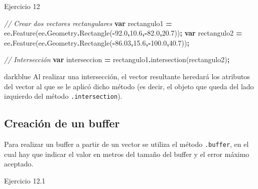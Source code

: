 \documentclass[
  12pt,
  letterpaper,
  twoside]{book}
\newenvironment{Shaded}{\begin{snugshade}}{\end{snugshade}}
\newcommand{\AttributeTok}[1]{\textcolor[rgb]{0.77,0.63,0.00}{#1}}
\newcommand{\CommentTok}[1]{\textcolor[rgb]{0.56,0.35,0.01}{\textit{#1}}}
\newcommand{\FloatTok}[1]{\textcolor[rgb]{0.00,0.00,0.81}{#1}}
\newcommand{\FunctionTok}[1]{\textcolor[rgb]{0.00,0.00,0.00}{#1}}
\newcommand{\KeywordTok}[1]{\textcolor[rgb]{0.13,0.29,0.53}{\textbf{#1}}}
\newcommand{\NormalTok}[1]{#1}
\newcommand{\OperatorTok}[1]{\textcolor[rgb]{0.81,0.36,0.00}{\textbf{#1}}}
\begin{document}
Ejercicio 12

\begin{Shaded}
\begin{Highlighting}[]
\CommentTok{// Crear dos vectores rectangulares}
\KeywordTok{var}\NormalTok{ rectangulo1 }\OperatorTok{=}\NormalTok{ ee}\OperatorTok{.}\FunctionTok{Feature}\NormalTok{(ee}\OperatorTok{.}\AttributeTok{Geometry}\OperatorTok{.}\FunctionTok{Rectangle}\NormalTok{(}\OperatorTok{{-}}\FloatTok{92.0}\OperatorTok{,}\FloatTok{10.6}\OperatorTok{,{-}}\FloatTok{82.0}\OperatorTok{,}\FloatTok{20.7}\NormalTok{))}\OperatorTok{;}
\KeywordTok{var}\NormalTok{ rectangulo2 }\OperatorTok{=}\NormalTok{ ee}\OperatorTok{.}\FunctionTok{Feature}\NormalTok{(ee}\OperatorTok{.}\AttributeTok{Geometry}\OperatorTok{.}\FunctionTok{Rectangle}\NormalTok{(}\OperatorTok{{-}}\FloatTok{86.03}\OperatorTok{,}\FloatTok{15.6}\OperatorTok{,{-}}\FloatTok{100.0}\OperatorTok{,}\FloatTok{40.7}\NormalTok{))}\OperatorTok{;}

\CommentTok{// Intersección}
\KeywordTok{var}\NormalTok{ interseccion }\OperatorTok{=}\NormalTok{ rectangulo1}\OperatorTok{.}\FunctionTok{intersection}\NormalTok{(rectangulo2)}\OperatorTok{;}
\end{Highlighting}
\end{Shaded}

\begin{bluebox2}

\begin{awesomeblock}{5pt}{\faLightbulb}{darkblue}
Al realizar una intersección, el vector resultante heredará los atributos del vector al que se le aplicó dicho método (es decir, el objeto que queda del lado izquierdo del método \texttt{.intersection}).

\end{awesomeblock}

\end{bluebox2}

\hypertarget{creaciuxf3n-de-un-buffer}{%
\subsection*{Creación de un buffer}\label{creaciuxf3n-de-un-buffer}}

Para realizar un buffer a partir de un vector se utiliza el método \texttt{.buffer}, en el cual hay que indicar el valor en metros del tamaño del buffer y el error máximo aceptado.

Ejercicio 12.1
\end{document}

